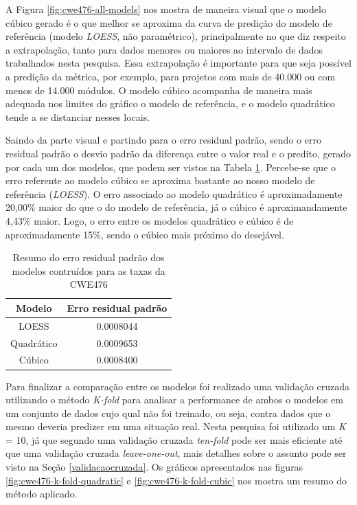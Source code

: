 A Figura \ref{fig:cwe476-all-models} nos mostra de maneira visual que o modelo
cúbico gerado é o que melhor se aproxima da curva de predição do modelo de
referência (modelo \textit{LOESS}, não paramétrico), principalmente no que diz
respeito a extrapolação, tanto para dados menores ou maiores ao intervalo de
dados trabalhados nesta pesquisa. Essa extrapolação é importante para que seja
possível a predição da métrica, por exemplo, para projetos com mais de 40.000 ou
com menos de 14.000 módulos. O modelo cúbico acompanha de maneira mais adequada
nos limites do gráfico o modelo de referência, e o modelo quadrático tende a se
distanciar nesses locais.

Saindo da parte visual e partindo para o erro residual padrão, sendo o erro
residual padrão o desvio padrão da diferença entre o valor real e o predito,
gerado por cada um dos modelos, que podem ser vistos na Tabela
\ref{tab:cwe476-erros}. Percebe-se que o erro referente ao modelo cúbico se
aproxima bastante ao nosso modelo de referência (\textit{LOESS}). O erro
associado ao modelo quadrático é aproximadamente 20,00\% maior do que o do
modelo de referência, já o cúbico é aproximandamente 4,43\% maior. Logo, o erro
entre os modelos quadrático e cúbico é de aproximadamente 15\%, sendo o cúbico
mais próximo do desejável.

\begin{table}[h]
 \centering
 \begin{tabular}{cc}
  \hline
  \rowcolor[HTML]{EFEFEF} 
  {Modelo} & {Erro residual padrão} \\ \hline
  {LOESS}  & 0.0008044                  \\ \hline
  Quadrático   & 0.0009653                  \\ \hline
  Cúbico       & 0.0008400                \\ \hline 
 \end{tabular}
 \caption{Resumo do erro residual padrão dos modelos contruídos para as taxas da
 CWE476}
 \label{tab:cwe476-erros}
\end{table}

Para finalizar a comparação entre os modelos foi realizado uma validação cruzada
utilizando o método \textit{K-fold} para analisar a performance de ambos o
modelos em um conjunto de dados cujo qual não foi treinado, ou seja, contra
dados que o mesmo deveria predizer em uma situação real. Nesta pesquisa foi
utilizado um \textit{K} = 10, já que segundo  uma
validação cruzada \textit{ten-fold} pode ser mais eficiente até que uma
validação cruzada \textit{leave-one-out}, mais detalhes sobre o assunto pode ser
visto na Seção \ref{validacaocruzada}. Os gráficos apresentados nas figuras
\ref{fig:cwe476-k-fold-quadratic} e \ref{fig:cwe476-k-fold-cubic} nos mostra um
resumo do método aplicado.

